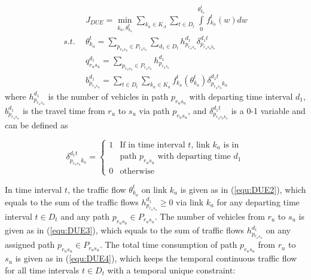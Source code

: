 \documentclass[final]{IEEEtran}
\begin{document}
\begin{subequations}\label{equ:due_equa}
	\begin{align}
	& J_{DUE} = \min_{k_a, \theta^t_{k_a}} \sum_{k_a\in K_A}\sum_{t\in D_t} \int\limits^{\theta^t_{k_a}}_{0}f^t_{k_a}(w)dw  \label{equ: DUE1} \\
	s.t.\ \  & \theta^t_{k_a} = \sum_{p_{r_us_u}\in P_{r_us_u}}\sum_{d_1\in D_t} h^{d_1}_{p_{r_us_u}} \delta^{d_1t}_{p_{r_us_uk_a}}  \label{equ:DUE2} \\
	& q^{d_1}_{r_us_u} = \sum_{p_{r_us_u}\in P_{r_us_u}} h^{d_1}_{p_{r_us_u}}  \label{equ:DUE3} \\
	& b^{d_1}_{p_{r_us_u}} = \sum_{t\in D_t}\sum_{k_a \in K_a}f^t_{k_a}(\theta^t_{k_a})\delta^{d_1t}_{p_{r_us_u}k_a} \label{equ:DUE4} 
	\end{align}
\end{subequations}
where $h^{d_1}_{p_{r_us_u}}$ is the number of vehicles in path $p_{r_us_u}$ with departing time interval $d_1$, $b^{d_1}_{p_{r_us_u}}$ is the travel time from $r_u$ to $s_u$ via path $p_{r_us_u}$, and $\delta^{d_1t}_{p_{r_us_uk_a}}$ is a 0-1 variable and can be defined as

\begin{equation}\label{equ:OSS01}
\delta^{d_1t}_{p_{r_us_u}k_a} =\left\{ \begin{array}{ll}
1    & \mbox{If in time interval $t$, link $k_a$ is in } \\
& \mbox{path $p_{r_us_u}$ with departing time $d_1$}  \\
0    & \mbox{otherwise}
\end{array}
\right .
\end{equation}

In time interval $t$, the traffic flow $\theta^t_{k_a}$ on link $k_a$ is given as in (\ref{equ:DUE2}), which equals to the sum of the traffic flows $h^{d_1}_{p_{r_us_u}} \geq 0$ via link $k_a$ for any departing time interval $t \in D_t$ and any path $p_{r_us_u}\in P_{r_us_u}$. The number of vehicles from  $r_u$ to $s_u$ is given as in (\ref{equ:DUE3}), which equals to the sum of traffic flows $h^{d_1}_{p_{r_us_u}}$ on any assigned path $p_{r_us_u}\in P_{r_us_u}$. The total time consumption of path $p_{r_us_u}$ from $r_u$ to $s_u$ is given as in (\ref{equ:DUE4}), which keeps the temporal continuous traffic flow for all time intervals $t\in D_t$ with a temporal unique constraint:
\end{document}
